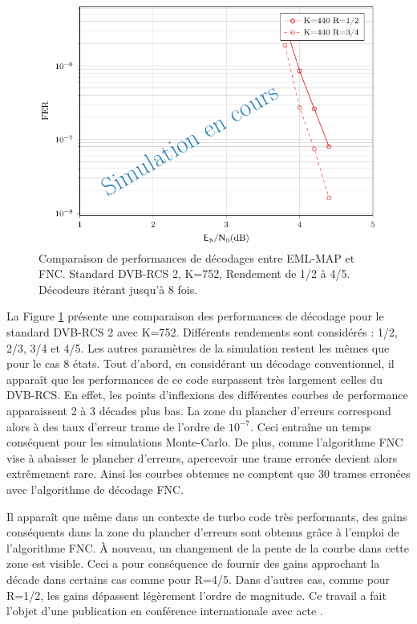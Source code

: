 \begin{figure}[!htb]
	\centering
	\includegraphics[width=\textwidth]{main/ch3_fig/fnc/dvb2/tikz/dvb2.pdf}
	\caption{Comparaison de performances de décodages entre EML-MAP et FNC. Standard DVB-RCS 2, K=752, Rendement de 1/2 à 
	4/5. Décodeurs itérant jusqu'à 8 fois. \label{fig:fnc_dvb2_752}}
\end{figure}

La Figure \ref{fig:fnc_dvb2_752} présente une comparaison des performances de décodage pour le standard DVB-RCS 2 avec
K=752. Différents rendements sont considérés : 1/2, 2/3, 3/4 et 4/5. Les autres paramètres de la simulation restent les
mêmes que pour le cas 8 états.
Tout d'abord, en considérant un décodage conventionnel, il apparaît que les performances de ce code surpassent très largement 
celles du DVB-RCS. En effet, les points d'inflexions des différentes courbes de performance apparaissent 2 à 3 décades
plus bas. La zone du plancher d'erreurs correspond alors à des taux d'erreur trame de l'ordre de $10^{-7}$. Ceci entraîne
un temps conséquent pour les simulations Monte-Carlo. De plus, comme l'algorithme FNC vise à abaisser le plancher 
d'erreurs, apercevoir une trame erronée devient alors extrêmement rare. Ainsi les courbes obtenues ne comptent que 30 
trames erronées avec l'algorithme de décodage FNC.

Il apparaît que même dans un contexte de turbo code très performants, des gains conséquents dans la zone du plancher d'erreurs 
sont obtenus grâce à l'emploi de l'algorithme FNC. À nouveau, un changement de la pente de la courbe dans cette zone est
visible. Ceci a pour conséquence de fournir des gains approchant la décade dans certains cas comme pour R=4/5. Dans d'autres
cas, comme pour R=1/2, les gains dépassent légèrement l'ordre de magnitude. Ce travail a fait l'objet d'une publication en
conférence internationale avec acte .

